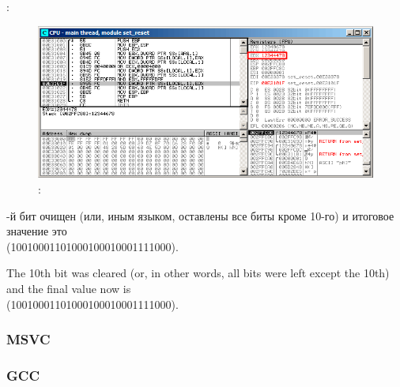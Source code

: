 \clearpage
\AND {}:

\begin{figure}[H]
\centering
\includegraphics[scale=\FigScale]{patterns/14_bitfields/2_set_reset/olly4.png}
\caption{\olly: \AND {}}
\label{fig:set_reset_olly4}
\end{figure}

\ifdefined{}-й бит очищен (или, иным языком, оставлены все биты кроме 10-го) и итоговое значение это \\
 (1001000110100010001{\color{red}0}001111000).
\fi %

\ifdefined\ENGLISH
The 10th bit was cleared (or, in other words, all bits were left except the 10th) and the final value now is \\
 (1001000110100010001{\color{red}0}001111000).
\fi %

\fi %

\subsubsection{\Optimizing MSVC}




\ifdefined\IncludeGCC
\subsubsection{\NonOptimizing GCC}


